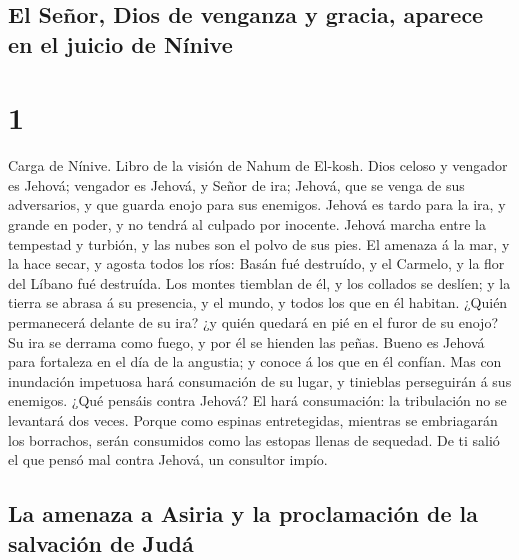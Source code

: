 \hypertarget{el-seuxf1or-dios-de-venganza-y-gracia-aparece-en-el-juicio-de-nuxednive}{%
\subsection{El Señor, Dios de venganza y gracia, aparece en el juicio de
Nínive}\label{el-seuxf1or-dios-de-venganza-y-gracia-aparece-en-el-juicio-de-nuxednive}}

\hypertarget{section}{%
\section{1}\label{section}}

 Carga de Nínive. Libro de la visión de Nahum de El-kosh.
 Dios celoso y vengador es Jehová; vengador es Jehová, y
Señor de ira; Jehová, que se venga de sus adversarios, y que guarda
enojo para sus enemigos.  Jehová es tardo para la ira, y
grande en poder, y no tendrá al culpado por inocente. Jehová marcha
entre la tempestad y turbión, y las nubes son el polvo de sus pies.
 El amenaza á la mar, y la hace secar, y agosta todos los
ríos: Basán fué destruído, y el Carmelo, y la flor del Líbano fué
destruída.  Los montes tiemblan de él, y los collados se
deslíen; y la tierra se abrasa á su presencia, y el mundo, y todos los
que en él habitan.  ¿Quién permanecerá delante de su ira?
¿y quién quedará en pié en el furor de su enojo? Su ira se derrama como
fuego, y por él se hienden las peñas.  Bueno es Jehová
para fortaleza en el día de la angustia; y conoce á los que en él
confían.  Mas con inundación impetuosa hará consumación de
su lugar, y tinieblas perseguirán á sus enemigos.  ¿Qué
pensáis contra Jehová? El hará consumación: la tribulación no se
levantará dos veces.  Porque como espinas entretegidas,
mientras se embriagarán los borrachos, serán consumidos como las estopas
llenas de sequedad.  De ti salió el que pensó mal contra
Jehová, un consultor impío.

\hypertarget{la-amenaza-a-asiria-y-la-proclamaciuxf3n-de-la-salvaciuxf3n-de-juduxe1}{%
\subsection{La amenaza a Asiria y la proclamación de la salvación de
Judá}\label{la-amenaza-a-asiria-y-la-proclamaciuxf3n-de-la-salvaciuxf3n-de-juduxe1}}

